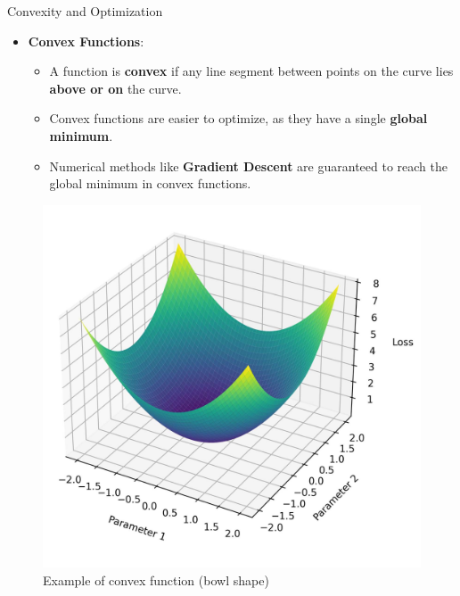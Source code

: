 \documentclass[serif, aspectratio=169]{beamer}
\begin{document}
\begin{frame}{Convexity and Optimization}
\begin{minipage}{0.6\linewidth}
    \begin{itemize}
        \item \textbf{Convex Functions}:
        \begin{itemize}
            \item A function is \textbf{convex} if any line segment between points on the curve lies \textbf{above or on} the curve.\\
            \item Convex functions are easier to optimize, as they have a single \textbf{global minimum}.\\
            \item Numerical methods like \textbf{Gradient Descent} are guaranteed to reach the global minimum in convex functions.
        \end{itemize}
    \end{itemize}
\end{minipage}%
\begin{minipage}{0.3\linewidth}
    \begin{figure}[h]
        \centering
        \includegraphics[height=0.7\textheight]{pic/loss_convex.jpg}
        \caption{\footnotesize Example of convex function (bowl shape)}
    \end{figure}
\end{minipage}
\end{frame}
\end{document}
